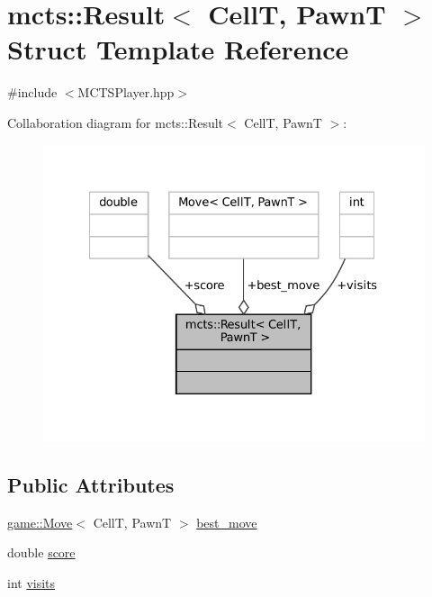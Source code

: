 \hypertarget{structmcts_1_1_result}{}\section{mcts\+:\+:Result$<$ CellT, PawnT $>$ Struct Template Reference}
\label{structmcts_1_1_result}


{\ttfamily \#include $<$M\+C\+T\+S\+Player.\+hpp$>$}



Collaboration diagram for mcts\+:\+:Result$<$ CellT, PawnT $>$\+:
\nopagebreak
\begin{figure}[H]
\begin{center}
\leavevmode
\includegraphics[width=327pt]{structmcts_1_1_result__coll__graph}
\end{center}
\end{figure}
\subsection*{Public Attributes}
\begin{DoxyCompactItemize}
\item 
\hyperlink{structgame_1_1_move}{game\+::\+Move}$<$ CellT, PawnT $>$ \hyperlink{structmcts_1_1_result_a7b379d95aea9fdae5700fc2b5e69b775}{best\+\_\+move}
\item 
double \hyperlink{structmcts_1_1_result_a03397dc4dfc826e29935aa4ee6d51059}{score}
\item 
int \hyperlink{structmcts_1_1_result_a3a540aa4397f0877f98d84760e89f8d2}{visits}
\end{DoxyCompactItemize}


